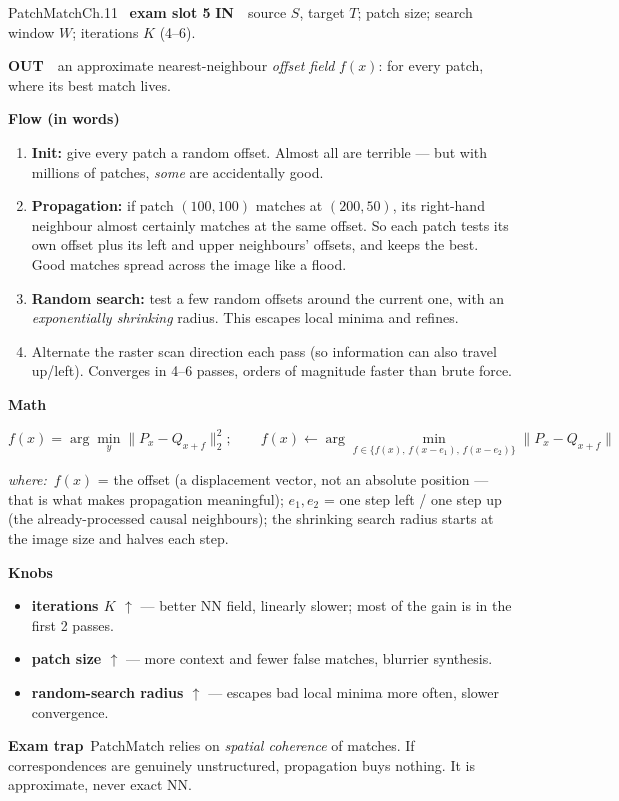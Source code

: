 \documentclass[9pt,a4paper]{extarticle}
\newcommand{\IN}{\textbf{\color{cIn}IN}\ }
\newcommand{\OUT}{\par\textbf{\color{cOut}OUT}\ }
\newcommand{\FLOW}{\par\smallskip\textbf{Flow (in words)}\par\nopagebreak}
\newcommand{\MATH}{\par\smallskip\textbf{Math}\par\nopagebreak}
\newcommand{\KNOBS}{\par\smallskip\textbf{Knobs}\par\nopagebreak}
\newcommand{\TRAP}{\par\smallskip\textbf{\color{cTrap}Exam trap}\ }
\newcommand{\WHERE}{\par\textit{where:}\ }
\newcommand{\up}{$\uparrow$}
\newcommand{\kn}[2]{\item \textbf{#1} --- #2}
\begin{document}
\begin{card}{PatchMatch}{Ch.11 \textbullet\ \textbf{exam slot 5}}
\IN\ source $S$, target $T$; patch size; search window $W$; iterations $K$ (4--6).
\OUT\ an approximate nearest-neighbour \emph{offset field} $f(x)$: for every patch, where its best match lives.

\FLOW
\begin{enumerate}
  \item \textbf{Init:} give every patch a random offset. Almost all are terrible --- but with millions of patches, \emph{some} are accidentally good.
  \item \textbf{Propagation:} if patch $(100,100)$ matches at $(200,50)$, its right-hand neighbour almost certainly matches at the same offset. So each patch tests its own offset plus its left and upper neighbours' offsets, and keeps the best. Good matches spread across the image like a flood.
  \item \textbf{Random search:} test a few random offsets around the current one, with an \emph{exponentially shrinking} radius. This escapes local minima and refines.
  \item Alternate the raster scan direction each pass (so information can also travel up/left). Converges in 4--6 passes, orders of magnitude faster than brute force.
\end{enumerate}

\MATH
\[ f(x)=\arg\min_{y}\|P_x-Q_{x+f}\|_2^2;\qquad
f(x)\leftarrow\arg\min_{f\in\{f(x),\,f(x-e_1),\,f(x-e_2)\}}\|P_x-Q_{x+f}\| \]
\WHERE $f(x)$ = the offset (a displacement vector, not an absolute position --- that is what makes propagation meaningful); $e_1,e_2$ = one step left / one step up (the already-processed causal neighbours); the shrinking search radius starts at the image size and halves each step.

\KNOBS
\begin{itemize}
  \kn{iterations $K$ \up}{better NN field, linearly slower; most of the gain is in the first 2 passes.}
  \kn{patch size \up}{more context and fewer false matches, blurrier synthesis.}
  \kn{random-search radius \up}{escapes bad local minima more often, slower convergence.}
\end{itemize}
\TRAP PatchMatch relies on \emph{spatial coherence} of matches. If correspondences are genuinely unstructured, propagation buys nothing. It is approximate, never exact NN.


\end{card}
\end{document}
